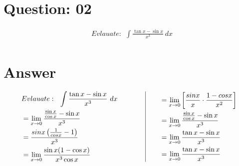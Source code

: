 \documentclass[17pt]{extarticle}
\begin{document}
\begin{fleqn}
\section{Question: 02}

\begin{equation} \nonumber
\begin{alignedat}{4}
& Evlauate :\ \  \int \frac{\tan{x} - \sin{x}}{x^3}\ dx\\
\end{alignedat}
\end{equation}



\section{Answer}
\begin{equation} \nonumber
\begin{alignedat}{4}
&  Evlauate :\ \  \int \frac{\tan{x} - \sin{x}}{x^3}\ dx\\
&= \lim_{x \to 0} \frac{\frac{\sin{x}}{\cos{x}}-\sin{x}}{x^3}\\
&= \frac{sin x\left(\frac{1}{cos x} - 1\right)}{x^3}\\
&= \lim_{x \to 0} \frac{\sin{x}(1  - \cos{x})}{x^3\cos{x}}\\
\end{alignedat}
\qquad
\qquad
\vrule
\qquad
\begin{alignedat}{4}
&= \lim_{x \to 0}\left[\frac{sin x}{x}\cdot\frac{1 - cos x}{x^2} \right] \\
&= \lim_{x \to 0} \frac{\frac{\sin{x}}{\cos{x}}-\sin{x}}{x^3}\\
&= \lim_{x \to 0} \frac{\tan{x} - \sin{x}}{x^3}\\
&= \lim_{x \to 0} \frac{\tan{x} - \sin{x}}{x^3}\\
\end{alignedat}
\end{equation}



\end{fleqn}
\end{document}
